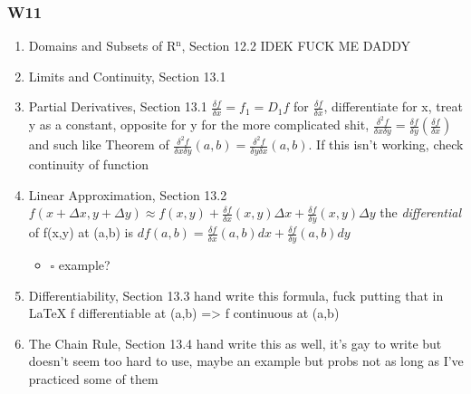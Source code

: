 \documentclass[11pt]{article}
\begin{document}
\subsubsection{W11}
\label{sec-1-1-4}
\begin{enumerate}
\item Domains and Subsets of R$^{\text{n}}$, Section 12.2
\label{sec-1-1-4-1}
IDEK FUCK ME DADDY
\item Limits and Continuity, Section 13.1
\label{sec-1-1-4-2}
\item Partial Derivatives, Section 13.1
\label{sec-1-1-4-3}
$\frac{\delta f}{\delta x}=f_{1}=D_{1}f$
for $\frac{\delta f}{\delta x}$, differentiate for x, treat y as a constant, opposite for y
for the more complicated shit, $\frac{\delta^{2} f}{\delta x \delta y} = \frac{\delta f}{\delta y}(\frac{\delta f}{\delta x})$ and such like
Theorem of $\frac{\delta^{2} f}{\delta x \delta y}(a,b)=\frac{\delta^{2} f}{\delta y \delta x}(a,b)$. If this isn't working, check continuity of function
\item Linear Approximation, Section 13.2
\label{sec-1-1-4-4}
$f(x+ \Delta x, y+\Delta y) \approx f(x,y)+\frac{\delta f}{\delta x}(x,y)\Delta x + \frac{\delta f}{\delta y}(x,y)\Delta y$
the \emph{differential} of f(x,y) at (a,b) is
$df(a,b)=\frac{\delta f}{\delta x}(a,b)dx+\frac{\delta f}{\delta y}(a,b)dy$
\begin{itemize}
\item $\square$ example?
\end{itemize}
\item Differentiability, Section 13.3
\label{sec-1-1-4-5}
hand write this formula, fuck putting that in \LaTeX{}
f differentiable at (a,b) => f continuous at (a,b)
\item The Chain Rule, Section 13.4
\label{sec-1-1-4-6}
hand write this as well, it's gay to write but doesn't seem too hard to use, maybe an example but probs not as long as I've practiced some of them
\end{enumerate}
\end{document}
